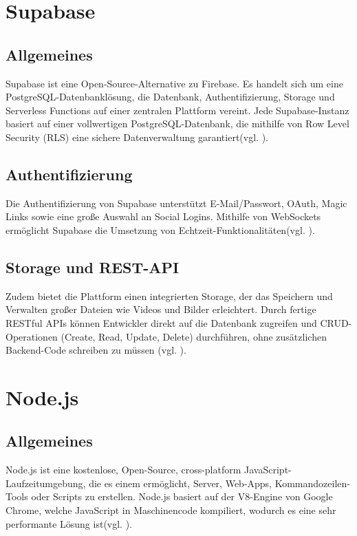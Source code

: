 \documentclass[oneside]{ausarbeitung}
\begin{document}
\section{Supabase}
\subsection{Allgemeines}
Supabase ist eine Open-Source-Alternative zu Firebase. Es handelt sich um eine PostgreSQL-Datenbanklösung, die Datenbank, Authentifizierung, Storage und Serverless Functions auf einer zentralen Plattform vereint. Jede Supabase-Instanz basiert auf einer vollwertigen PostgreSQL-Datenbank, die mithilfe von Row Level Security (RLS) eine sichere Datenverwaltung garantiert(vgl. \parencite{supabase}).

\subsection{Authentifizierung}
Die Authentifizierung von Supabase unterstützt E-Mail/Passwort, OAuth, Magic Links sowie eine große Auswahl an Social Logins. Mithilfe von WebSockets ermöglicht Supabase die Umsetzung von Echtzeit-Funktionalitäten(vgl. \parencite{supabase}).

\subsection{Storage und REST-API}
Zudem bietet die Plattform einen integrierten Storage, der das Speichern und Verwalten großer Dateien wie Videos und Bilder erleichtert. Durch fertige RESTful APIs können Entwickler direkt auf die Datenbank zugreifen und CRUD-Operationen (Create, Read, Update, Delete) durchführen, ohne zusätzlichen Backend-Code schreiben zu müssen (vgl. \parencite{supabase}). 

\section{Node.js}
\subsection{Allgemeines}
Node.js ist eine kostenlose, Open-Source, cross-platform JavaScript-Laufzeitumgebung, die es einem ermöglicht, Server, Web-Apps, Kommandozeilen-Tools oder Scripts zu erstellen. Node.js basiert auf der V8-Engine von Google Chrome, welche JavaScript in Maschinencode kompiliert, wodurch es eine sehr performante Lösung ist(vgl. \parencite{node.js}).
\end{document}
